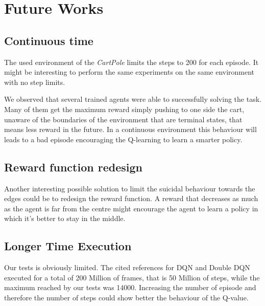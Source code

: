 
\section{Future Works}

\subsection{Continuous time}

The used environment of the \textit{CartPole} limits the steps to 200 for each episode. It might be interesting to perform the same experiments on the same environment with no step limits.

We observed that several trained agents were able to successfully solving the task. Many of them get the maximum reward simply pushing to one side the cart, unaware of the boundaries of the environment that are terminal states, that means less reward in the future. In a continuous environment this behaviour will leads to a bad episode encouraging the Q-learning to learn a smarter policy.

\subsection{Reward function redesign}

Another interesting possible solution to limit the suicidal behaviour towards the edges could be to redesign the reward function. A reward that decreases as much as the agent is far from the centre might encourage the agent to learn a policy in which it's better to stay in the middle.

\subsection{Longer Time Execution}

Our tests is obviously limited. The cited references for DQN and Double DQN executed for a total of 200 Million of frames, that is 50 Million of steps, while the maximum reached by our tests was 14000. Increasing the number of episode and therefore the number of steps could show better the behaviour of the Q-value.